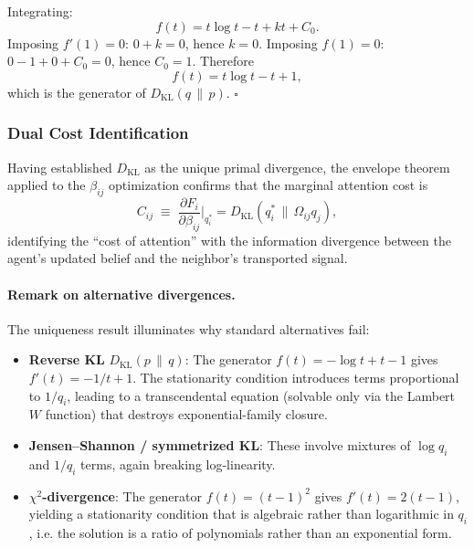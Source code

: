 \documentclass[twoside,11pt]{article}
\begin{document}
Integrating:
\[
f(t) = t\log t - t + kt + C_0.
\]
Imposing $f'(1)=0$: $0 + k = 0$, hence $k=0$.  Imposing $f(1)=0$: $0 - 1 + 0 + C_0 = 0$, hence $C_0 = 1$.  Therefore
\[
f(t) = t\log t - t + 1,
\]
which is the generator of $D_{\mathrm{KL}}(q\,\|\,p)$. \hfill $\square$

\subsubsection{Dual Cost Identification}
Having established $D_{\mathrm{KL}}$ as the unique primal divergence, the envelope theorem applied to the $\beta_{ij}$ optimization confirms that the marginal attention cost is
\begin{equation}
C_{ij} \;\equiv\; \frac{\partial F_i}{\partial\beta_{ij}}\bigg|_{q_i^*}
= D_{\mathrm{KL}}(q_i^*\,\|\,\Omega_{ij}q_j),
\end{equation}
identifying the ``cost of attention'' with the information divergence between the agent's updated belief and the neighbor's transported signal.

\paragraph{Remark on alternative divergences.}
The uniqueness result illuminates why standard alternatives fail:
\begin{itemize}
    \item \textbf{Reverse KL} $D_{\mathrm{KL}}(p\,\|\,q)$: The generator $f(t)=-\log t + t - 1$ gives $f'(t)=-1/t+1$. The stationarity condition introduces terms proportional to $1/q_i$, leading to a transcendental equation (solvable only via the Lambert $W$ function) that destroys exponential-family closure.
    \item \textbf{Jensen--Shannon / symmetrized KL}: These involve mixtures of $\log q_i$ and $1/q_i$ terms, again breaking log-linearity.
    \item \textbf{$\chi^2$-divergence}: The generator $f(t)=(t-1)^2$ gives $f'(t)=2(t-1)$, yielding a stationarity condition that is algebraic rather than logarithmic in $q_i$, i.e. the solution is a ratio of polynomials rather than an exponential form.
\end{itemize}
\end{document}
